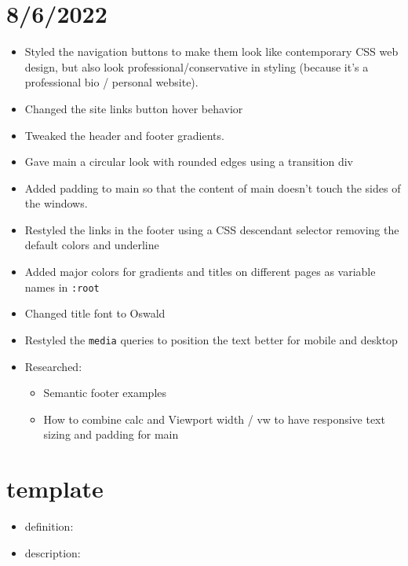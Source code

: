 \documentclass{article}
\begin{document}
\section*{8/6/2022}
\begin{itemize}
	\item Styled the navigation buttons to make them look like contemporary CSS web design, but also look professional/conservative in styling (because it's a professional bio / personal website).
	\item Changed the site links button hover behavior 
	\item Tweaked the header and footer gradients.
	\item Gave main a circular look with rounded edges using a transition div
	\item Added padding to main so that the content of main doesn't touch the sides of the windows.
	\item Restyled the links in the footer using a CSS descendant selector removing the default colors and underline
	\item Added major colors for gradients and titles on different pages as variable names in
	 \texttt{:root} 
	\item Changed title font to Oswald
	\item Restyled the \texttt{media} queries to position the text better for mobile and desktop
	\item Researched:
		\begin{itemize} 
	 			\item Semantic footer examples
	 			\item How to combine calc and Viewport width / vw to have responsive text sizing and padding for main
		\end{itemize}
\end{itemize}



\section*{template}
	
\begin{itemize}
	\item definition:
	\item description:
\end{itemize}


















































	
\end{document}
